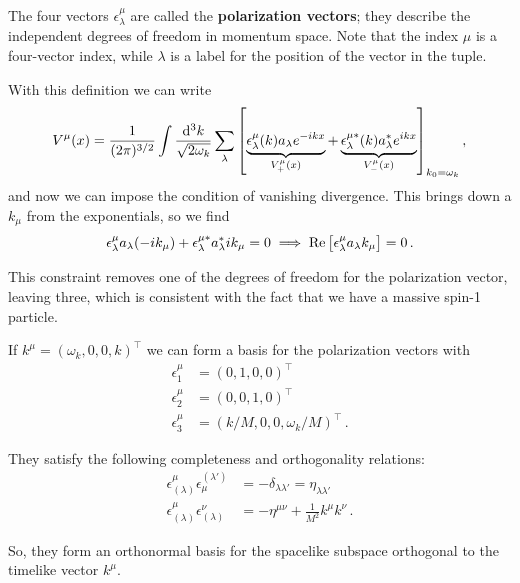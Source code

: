 \documentclass[main.tex]{subfiles}
\begin{document}
The four vectors \(\epsilon^{\mu }_{\lambda }\) are called the \textbf{polarization vectors}; they describe the independent degrees of freedom in momentum space. Note that the index \(\mu \) is a four-vector index, while \(\lambda \) is a label for the position of the vector in the tuple. 

With this definition we can write 
%
\begin{align}
V^{\mu } (x) = \frac{1}{(2 \pi )^{3/2}}
\int 
\frac{ \dd[3]{k}}{\sqrt{2 \omega_{k}}}
\sum _{\lambda } \qty[
\underbrace{\epsilon^{\mu }_{\lambda }(k) a_\lambda e^{-ikx}}_{V_{+}^{\mu }(x)}
+
\underbrace{\epsilon^{\mu *}_{\lambda } (k) a_\lambda^{*} e^{ikx}}_{V_{-}^{\mu }(x)}
]_{k_0 = \omega_{k}}
\,,
\end{align}
%
and now we can impose the condition of vanishing divergence. This brings down a \(k_{\mu }\) from the exponentials, so we find 
%
\begin{align}
\epsilon^{\mu }_{\lambda } a_{\lambda } (-i k_\mu ) + \epsilon^{\mu *}_{\lambda } a^{*}_{\lambda } i k_\mu = 0 \implies \Re \qty[\epsilon^{\mu }_{\lambda } a_{\lambda } k_\mu ] = 0
\,.
\end{align}


This constraint removes one of the degrees of freedom for the polarization vector, leaving three, which is consistent with the fact that we have a massive spin-1 particle. 

\begin{claim}
If \(k^{\mu } = (\omega_{k}, 0, 0, k)^{\top}\) we can form a basis for the polarization vectors with 
%
\begin{subequations}
\begin{align}
\epsilon^{\mu }_{1} &= (0, 1, 0, 0)^{\top}  \\
\epsilon^{\mu }_{2} &= (0, 0, 1, 0)^{\top}  \\
\epsilon^{\mu }_{3} &= (k/M, 0, 0 , \omega_{k} / M)^{\top}  
\,.
\end{align}
\end{subequations}

They satisfy the following completeness and orthogonality relations: 
%
\begin{subequations}
\begin{align}
\epsilon^{\mu }_{ (\lambda )} \epsilon^{(\lambda' )}_{\mu } &= - \delta_{\lambda \lambda '} = \eta_{\lambda \lambda '} \\
\epsilon^{\mu }_{(\lambda )} \epsilon^{\nu }_{(\lambda )} &= -\eta^{\mu \nu } + \frac{1}{M^2} k^{\mu } k^{\nu }
\,.
\end{align}
\end{subequations}

So, they form an orthonormal basis for the spacelike subspace orthogonal to the timelike vector \(k^{\mu }\). 
\end{claim}
\end{document}

